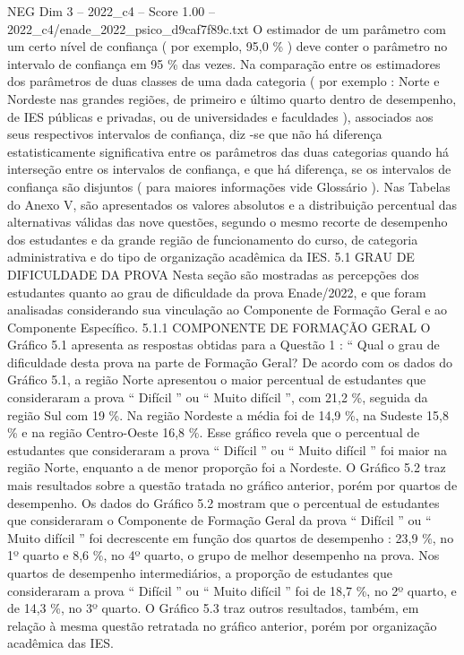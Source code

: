\begin{textsample}{NEG Dim 3 – 2022\_c4 – Score 1.00 – 2022\_c4/enade\_2022\_psico\_d9caf7f89c.txt}
O estimador de um parâmetro com um certo nível de confiança ( por exemplo, 95,0 \% ) deve conter o parâmetro no intervalo de confiança em 95 \% das vezes.
Na comparação entre os estimadores dos parâmetros de duas classes de uma dada categoria ( por exemplo : Norte e Nordeste nas grandes regiões, de primeiro e último quarto dentro de desempenho, de IES públicas e privadas, ou de universidades e faculdades ), associados aos seus respectivos intervalos de confiança, diz -se que não há diferença estatisticamente significativa entre os parâmetros das duas categorias quando há interseção entre os intervalos de confiança, e que há diferença, se os intervalos de confiança são disjuntos ( para maiores informações vide Glossário ).
Nas Tabelas do Anexo V, são apresentados os valores absolutos e a distribuição percentual das alternativas válidas das nove questões, segundo o mesmo recorte de desempenho dos estudantes e da grande região de funcionamento do curso, de categoria administrativa e do tipo de organização acadêmica da IES. 5.1 GRAU DE DIFICULDADE DA PROVA Nesta seção são mostradas as percepções dos estudantes quanto ao grau de dificuldade da prova Enade/2022, e que foram analisadas considerando sua vinculação ao Componente de Formação Geral e ao Componente Específico. 5.1.1 COMPONENTE DE FORMAÇÃO GERAL O Gráfico 5.1 apresenta as respostas obtidas para a Questão 1 : “ Qual o grau de dificuldade desta prova na parte de Formação Geral?
De acordo com os dados do Gráfico 5.1, a região Norte apresentou o maior percentual de estudantes que consideraram a prova “ Difícil ” ou “ Muito difícil ”, com 21,2 \%, seguida da região Sul com 19 \%.
Na região Nordeste a média foi de 14,9 \%, na Sudeste 15,8 \% e na região Centro-Oeste 16,8 \%.
Esse gráfico revela que o percentual de estudantes que consideraram a prova “ Difícil ” ou “ Muito difícil ” foi maior na região Norte, enquanto a de menor proporção foi a Nordeste.
O Gráfico 5.2 traz mais resultados sobre a questão tratada no gráfico anterior, porém por quartos de desempenho.
Os dados do Gráfico 5.2 mostram que o percentual de estudantes que consideraram o Componente de Formação Geral da prova “ Difícil ” ou “ Muito difícil ” foi decrescente em função dos quartos de desempenho : 23,9 \%, no 1º quarto e 8,6 \%, no 4º quarto, o grupo de melhor desempenho na prova.
Nos quartos de desempenho intermediários, a proporção de estudantes que consideraram a prova “ Difícil ” ou “ Muito difícil ” foi de 18,7 \%, no 2º quarto, e de 14,3 \%, no 3º quarto.
O Gráfico 5.3 traz outros resultados, também, em relação à mesma questão retratada no gráfico anterior, porém por organização acadêmica das IES.

\end{textsample}
